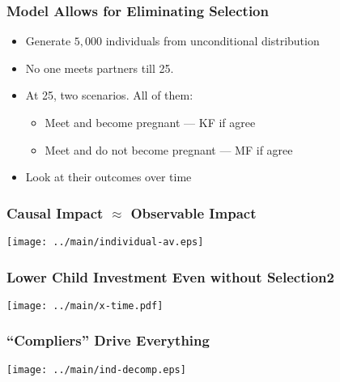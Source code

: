 \documentclass{beamer}
\begin{document}
\begin{frame}
\frametitle{Model Allows for Eliminating Selection}

\begin{itemize}
\item Generate $5{,}000$ individuals from unconditional distribution
\item No one meets partners till 25.
\item At 25, two scenarios. All of them:
\begin{itemize}
\item Meet and become pregnant --- KF if agree
\item Meet and do not become pregnant --- MF if agree
\end{itemize}
\item Look at their outcomes over time
\end{itemize}
\end{frame}

\begin{frame}
\frametitle{Causal Impact $\approx$ Observable Impact}
\begin{center}
\texttt{[image: ../main/individual-av.eps]}
\end{center}
\end{frame}



\begin{frame}
\frametitle{Lower Child Investment Even without Selection2}
\vspace{-2cm}
\begin{center}
\texttt{[image: ../main/x-time.pdf]}
\end{center}
\end{frame}


\begin{frame}
\frametitle{``Compliers'' Drive Everything}
\begin{center}
\texttt{[image: ../main/ind-decomp.eps]}
\end{center}
\end{frame}
\end{document}
